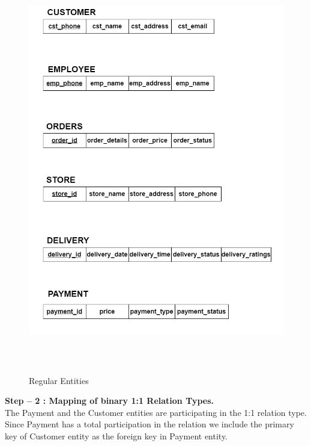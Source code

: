 \documentclass[12pt,a4paper]{report}
\begin{document}
\begin{figure}[hbtp]
\centering
\includegraphics[width=6in,height=7in]{../fig/regular (1)}
\caption{Regular Entities}
\end{figure} 
\newpage
\noindent \textbf{Step – 2 : Mapping of binary 1:1 Relation Types.}\\
The Payment and the Customer entities are participating in the 1:1 relation type. Since Payment has a total participation in the relation we include the primary key of Customer entity as the foreign key in Payment entity.\\
\end{document}
